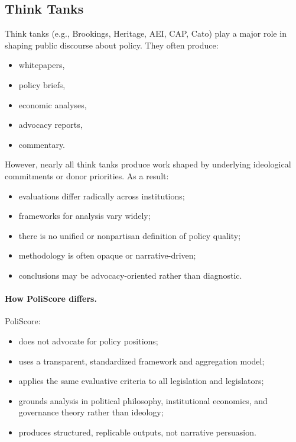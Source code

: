 \documentclass[12pt]{article}
\begin{document}
\subsection{Think Tanks}

Think tanks (e.g., Brookings, Heritage, AEI, CAP, Cato) play a major role in shaping public discourse about policy. They
often produce:

\begin{itemize}
    \item whitepapers,
    \item policy briefs,
    \item economic analyses,
    \item advocacy reports,
    \item commentary.
\end{itemize}

However, nearly all think tanks produce work shaped by underlying ideological commitments or donor priorities. As a result:

\begin{itemize}
    \item evaluations differ radically across institutions;
    \item frameworks for analysis vary widely;
    \item there is no unified or nonpartisan definition of policy quality;
    \item methodology is often opaque or narrative-driven;
    \item conclusions may be advocacy-oriented rather than diagnostic.
\end{itemize}

\paragraph{How PoliScore differs.}

PoliScore:

\begin{itemize}
    \item does not advocate for policy positions;
    \item uses a transparent, standardized framework and aggregation model;
    \item applies the same evaluative criteria to all legislation and legislators;
    \item grounds analysis in political philosophy, institutional economics, and governance theory rather than ideology;
    \item produces structured, replicable outputs, not narrative persuasion.
\end{itemize}
\end{document}
